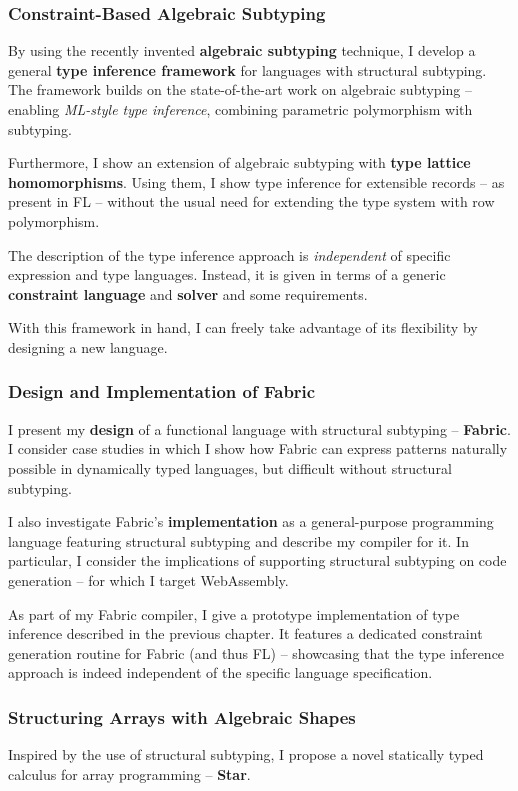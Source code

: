 \subsubsection{Constraint-Based Algebraic Subtyping}

By using the recently invented \textbf{algebraic subtyping} technique, I develop a general \textbf{type inference framework} for languages with structural subtyping. 
The framework builds on the state-of-the-art work on algebraic subtyping -- enabling \textit{ML-style type inference}, combining parametric polymorphism with subtyping. 

Furthermore, I show an extension of algebraic subtyping with \textbf{type lattice homomorphisms}. Using them, I show type inference for extensible records -- as present in FL -- without the usual need for extending the type system with row polymorphism.

The description of the type inference approach is \emph{independent} of specific expression and type languages. Instead, it is given in terms of a generic \textbf{constraint language} and \textbf{solver} and some requirements. 

With this framework in hand, I can freely take advantage of its flexibility by designing a new language.

\subsubsection{Design and Implementation of Fabric}
I present my \textbf{design} of a functional language with structural subtyping -- \textbf{Fabric}. 
I consider case studies in which I show how Fabric can express patterns naturally possible in dynamically typed languages, but difficult without structural subtyping. 

I also investigate Fabric's \textbf{implementation} as a general-purpose programming language featuring structural subtyping and describe my compiler for it. In particular, I consider the implications of supporting structural subtyping on code generation -- for which I target WebAssembly.

As part of my Fabric compiler, I give a prototype implementation of type inference described in the previous chapter. It features a dedicated constraint generation routine for Fabric (and thus FL) -- showcasing that the type inference approach is indeed independent of the specific language specification.

\subsubsection{Structuring Arrays with Algebraic Shapes}
Inspired by the use of structural subtyping, I propose a novel statically typed calculus for array programming -- \textbf{Star}. 

